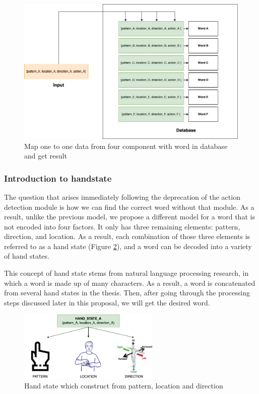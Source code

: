 \begin{figure}[H]
	\centering
	\includegraphics[width=\textwidth]{img/Chap4/MapWord.png}
	\caption{Map one to one data from four component with word in database and get result}
	\label{fig:Chap4-MapWord}
\end{figure}

\subsubsection{ Introduction to handstate }\label{sec:handstate}

The question that arises immediately following the deprecation of the action detection module is how we can find the correct word without that module. As a result, unlike the previous model, we propose a different model for a word that is not encoded into four factors. It only has three remaining elements: pattern, direction, and location. As a result, each combination of those three elements is referred to as a hand state (Figure \ref{fig:Chap4-HandState}), and a word can be decoded into a variety of hand states.

This concept of hand state stems from natural language processing research, in which a word is made up of many characters. As a result, a word is concatenated from several hand states in the thesis. Then, after going through the processing steps discussed later in this proposal, we will get the desired word.

\begin{figure}[H]
  \centering
  \includegraphics[width=0.6\textwidth]{img/Chap4/HandState.png}
  \caption{ Hand state which construct from pattern, location and direction}
  \label{fig:Chap4-HandState}
\end{figure}

